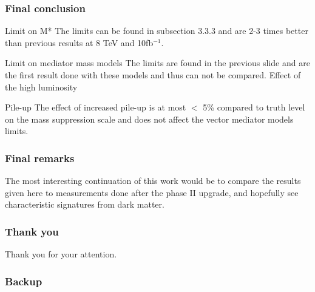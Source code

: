 \documentclass[handout]{beamer}
\begin{document}
\begin{frame}[shrink=10]\frametitle{Final conclusion}
\begin{block}{Limit on M*}
The limits can be found in subsection 3.3.3 and are 2-3 times better than previous
results at 8 TeV and 10fb$^{-1}$.
\end{block}
\begin{block}{Limit on mediator mass models}
The limits are found in the previous slide and are the first result done with these models and thus can not be compared.
Effect of the high luminosity
\end{block}
\begin{block}{Pile-up}
The effect of increased pile-up is at most $<$ 5\% compared to truth level on the mass suppression scale and does not affect the vector mediator models limits.
\end{block}
\end{frame}

\begin{frame}[shrink=10]\frametitle{Final remarks}
\begin{block}{}
The most interesting continuation of this work would be to compare the results given here to measurements done after the phase II upgrade, and hopefully see characteristic signatures from dark matter.
\end{block}
\end{frame}

\begin{frame}\frametitle{Thank you}
\begin{block}{}
Thank you for your attention.
\end{block}
\end{frame}


\begin{frame}[noframenumbering]\frametitle{Backup}

\end{frame}
\end{document}
